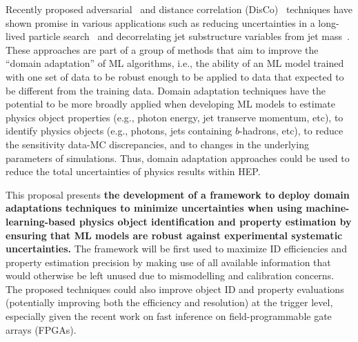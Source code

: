 \documentclass[letter, USenglish, 11pt, subfigure]{article}
\begin{document}
Recently proposed adversarial~\cite{louppe2017learning} and distance correlation (DisCo)~\cite{PhysRevLett.125.122001} techniques have shown promise in various applications such as reducing uncertainties in a long-lived particle search~\cite{calRatio} and decorrelating jet substructure variables from jet mass~\cite{ATL-PHYS-PUB-2018-014}. These approaches are part of a group of methods that aim to improve the ``domain adaptation'' of ML algorithms, i.e., the ability of an ML model trained with one set of data to be robust enough to be applied to data that expected to be different from the training data. Domain adaptation techniques have the potential to be more broadly applied when developing ML models to estimate physics object properties (e.g., photon energy, jet transerve momentum, etc), to identify physics objects (e.g., photons, jets containing $b$-hadrons, etc), to reduce the sensitivity data-MC discrepancies, and to changes in the underlying parameters of simulations. Thus, domain adaptation approaches could be used to reduce the total uncertainties of physics results within HEP. 


This proposal presents {\bf the development of a framework to deploy domain adaptations techniques to minimize uncertainties when using machine-learning-based physics object identification and property estimation by ensuring that ML models are robust against experimental systematic uncertainties. } The framework will be first used to maximize ID efficiencies and property estimation precision by making use of all available information that would otherwise be left unused due to mismodelling and calibration concerns. The proposed techniques could also improve object ID and property evaluations (potentially improving both the efficiency and resolution) at the trigger level, especially given the recent work on fast inference on field-programmable gate arrays (FPGAs).
\end{document}
